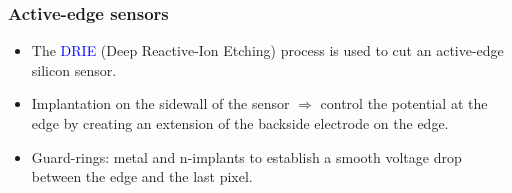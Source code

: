 \begin{frame}
  \frametitle{Active-edge sensors}

  \begin{itemize}
  \item The \textcolor{Blue}{DRIE} (Deep Reactive-Ion Etching) process
    is used to cut an active-edge silicon sensor.
  \item Implantation on the sidewall of the sensor $\Rightarrow$
    control the potential at the edge by creating an extension of the
    backside electrode on the edge.
  \item Guard-rings: metal and n-implants to establish a smooth
    voltage drop between the edge and the last pixel.
  \end{itemize}

  \begin{columns}

    \centering
    

\end{columns}
\end{frame}
